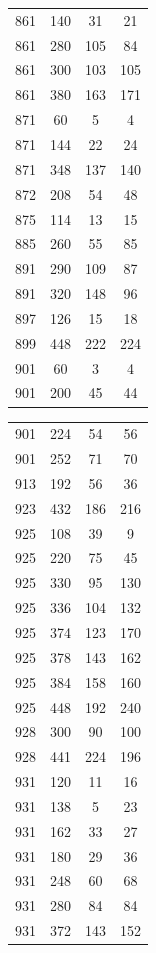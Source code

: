 \documentclass[12pt]{amsproc} %
\theoremstyle{definition}\newtheorem{defn}[thm]{Definition}
\theoremstyle{definition}\newtheorem{rem}[thm]{Remark}
\theoremstyle{definition}\newtheorem{ex}[thm]{Example}
\begin{document}
\begin{table}[ht!]
\begin{minipage}{0.25\textwidth}
\begin{tabular}{c|c|c|c}
      861&140&31&21\\ 
      861&280&105&84\\ 
      861&300&103&105\\ 
      861&380&163&171\\ 
      871&60&5&4\\ 
      871&144&22&24\\ 
      871&348&137&140\\ 
      872&208&54&48\\ 
      875&114&13&15\\ 
      885&260&55&85\\ 
      891&290&109&87\\ 
      891&320&148&96\\ 
      897&126&15&18\\ 
      899&448&222&224\\ 
      901&60&3&4\\ 
      901&200&45&44\\ 
            \end{tabular}
    \end{minipage}
    \hfill
    \begin{minipage}{0.25\textwidth}
        \centering
        \begin{tabular}{c|c|c|c}  
      901&224&54&56\\ 
      901&252&71&70\\ 
      913&192&56&36\\
      923&432&186&216\\ 
      925&108&39&9\\ 
      925&220&75&45\\ 
      925&330&95&130\\ 
      925&336&104&132\\ 
      925&374&123&170\\ 
      925&378&143&162\\ 
      925&384&158&160\\ 
      925&448&192&240\\ 
      928&300&90&100\\ 
      928&441&224&196\\ 
      931&120&11&16\\ 
      931&138&5&23\\ 
      931&162&33&27\\ 
      931&180&29&36\\
      931&248&60&68\\ 
      931&280&84&84\\ 
      931&372&143&152\\ 

\end{tabular}
\end{minipage}
\end{table}
\end{document}
